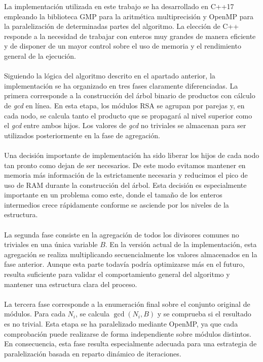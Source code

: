 La implementación utilizada en este trabajo se ha desarrollado en C++17 empleando la biblioteca GMP para la aritmética multiprecisión y OpenMP para la paralelización de determinadas partes del algoritmo. La elección de C++ responde a la necesidad de trabajar con enteros muy grandes de manera eficiente y de disponer de un mayor control sobre el uso de memoria y el rendimiento general de la ejecución.
\\
\\
Siguiendo la lógica del algoritmo descrito en el apartado anterior, la implementación se ha organizado en tres fases claramente diferenciadas. La primera corresponde a la construcción del árbol binario de productos con cálculo de \textit{gcd} en línea. En esta etapa, los módulos RSA se agrupan por parejas y, en cada nodo, se calcula tanto el producto que se propagará al nivel superior como el \textit{gcd} entre ambos hijos. Los valores de \textit{gcd} no triviales se almacenan para ser utilizados posteriormente en la fase de agregación.
\\
\\
Una decisión importante de implementación ha sido liberar los hijos de cada nodo tan pronto como dejan de ser necesarios. De este modo evitamos mantener en memoria más información de la estrictamente necesaria y reducimos el pico de uso de RAM durante la construcción del árbol. Esta decisión es especialmente importante en un problema como este, donde el tamaño de los enteros intermedios crece rápidamente conforme se asciende por los niveles de la estructura.
\\
\\
La segunda fase consiste en la agregación de todos los divisores comunes no triviales en una única variable \(B\). En la versión actual de la implementación, esta agregación se realiza multiplicando secuencialmente los valores almacenados en la fase anterior. Aunque esta parte todavía podría optimizarse más en el futuro, resulta suficiente para validar el comportamiento general del algoritmo y mantener una estructura clara del proceso.
\\
\\
La tercera fase corresponde a la enumeración final sobre el conjunto original de módulos. Para cada \(N_i\), se calcula \(\gcd(N_i,B)\) y se comprueba si el resultado es no trivial. Esta etapa se ha paralelizado mediante OpenMP, ya que cada comprobación puede realizarse de forma independiente sobre módulos distintos. En consecuencia, esta fase resulta especialmente adecuada para una estrategia de paralelización basada en reparto dinámico de iteraciones.
